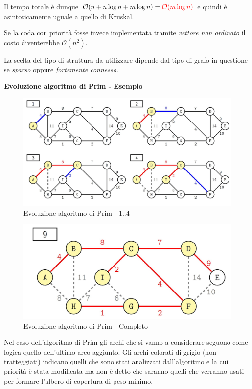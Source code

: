 \documentclass[../cheatSheetAlgoritmi.tex]{subfiles}
\begin{document}
Il tempo totale è dunque $\mathcal{O}(n + n \log n + m \log n) = \textcolor{red}{\mathcal{O}(m \log n)}$ e quindi è asintoticamente uguale a quello di Kruskal.

Se la coda con priorità fosse invece implementata tramite \emph{vettore non ordinato} il costo diventerebbe $\mathcal{O}(n^{2})$.

La scelta del tipo di struttura da utilizzare dipende dal tipo di grafo in questione se \emph{sparso} oppure \emph{fortemente connesso}.

\bigskip

\textbf{Evoluzione algoritmo di Prim - Esempio}
\begin{center}
	\begin{figure}[H]
		\includegraphics[width=\linewidth]{../img/Greedy_9.jpg}
		\caption{Evoluzione algoritmo di Prim - 1..4}
	\end{figure}
\end{center}
\begin{center}
	\begin{figure}[H]
		\includegraphics[width=\linewidth]{../img/Greedy_10.jpg}
		\caption{Evoluzione algoritmo di Prim - Completo}
	\end{figure}
\end{center}

Nel caso dell'algoritmo di Prim gli archi che si vanno a considerare seguono come logica quello dell'ultimo arco aggiunto. Gli archi colorati di grigio (non tratteggiati) indicano quelli che sono stati analizzati dall'algoritmo e la cui priorità è stata modificata ma non è detto che saranno quelli che verranno usati per formare l'albero di copertura di peso minimo.
 
\end{document}
